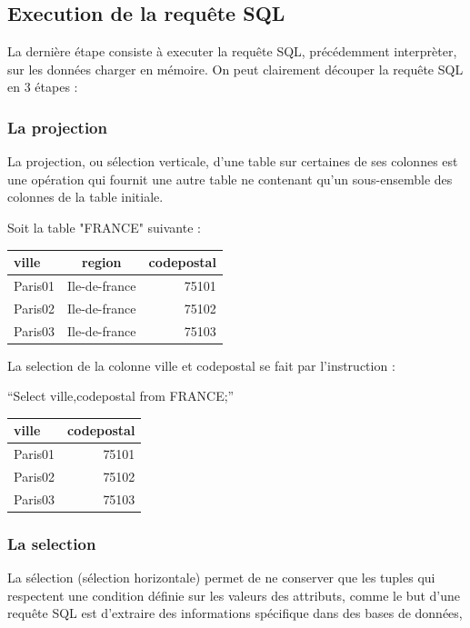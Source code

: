 \documentclass[oneside,13pt,a4paper]{report}
\begin{document}
\subsection{Execution de la requête SQL}

La dernière étape consiste à executer la requête SQL, précédemment interprèter, sur les données charger en mémoire.
On peut clairement découper la requête SQL en 3 étapes :

\subsubsection{La projection}

La projection, ou sélection verticale, d'une table sur certaines de ses colonnes est une opération qui fournit une autre table ne contenant qu'un sous-ensemble des colonnes de la table initiale.

Soit la table "FRANCE" suivante :

\begin{tabular}{|l|c|r|}
	\hline
	ville   & region        & codepostal
	\\
	\hline
	Paris01 & Ile-de-france & 75101      \\
	Paris02 & Ile-de-france & 75102      \\
	Paris03 & Ile-de-france & 75103      \\
	\hline
\end{tabular}

La selection de la colonne ville et codepostal se fait par l'instruction :

\enquote{Select ville,codepostal from FRANCE;}

\begin{tabular}{|l|r|}
	\hline
	ville & codepostal
	\\
	\hline
	Paris01 & 75101  \\
	Paris02 & 75102 \\
	Paris03 & 75103 \\
	\hline
\end{tabular}

\subsubsection{La selection}

La sélection (sélection horizontale) permet de ne conserver que les tuples qui respectent une condition définie sur les valeurs des attributs, 
comme le but d'une requête SQL est d'extraire des informations spécifique dans des bases de données, 
\end{document}
